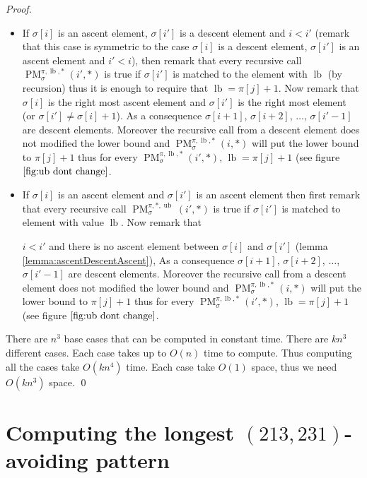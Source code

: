 \documentclass[a4paper]{llncs}
\newcommand{\ptext}{\pi}
\newcommand{\ppattern}{\sigma}
\DeclareMathOperator{\PMa}{PM}
\newcommand{\PM}[6]{\PMa_{{#1}}^{{#2},{#3},{#4}}({#5},{#6})}
\DeclareMathOperator{\lb}{lb}
\DeclareMathOperator{\ub}{ub}
\begin{document}
\begin{proof}
\begin{itemize}
\begin{itemize}
			\item If $\ppattern[i]$ is an ascent element, $\ppattern[i']$ is a descent element and $i<i'$ (remark that this case is symmetric to the case $\ppattern[i]$ is a descent element, $\ppattern[i']$ is an ascent element and $i'<i$), then
			remark that every recursive call
			$\PM{\sigma}{\ptext}{\lb}{*}{i'}{*}$ is true if $\sigma[i']$ is matched to the element with $\lb$ (by recursion) thus it is enough to require that $\lb=\ptext[j]+1$.
			Now remark that
			$\ppattern[i]$ is the right most ascent element and $\ppattern[i']$ is the right most element (or $\ppattern[i'] \neq \ppattern[i]+1$). 
			As a consequence $\sigma[i+1]$, $\sigma[i+2]$, $\ldots$, $\sigma[i'-1]$ are descent elements. Moreover the recursive call from a descent element does not modified the lower bound and $\PM{\sigma}{\ptext}{\lb}{*}{i}{*}$ will put the lower bound to $\ptext[j]+1$
			thus for every $\PM{\sigma}{\ptext}{\lb}{*}{i'}{*}$, $\lb=\ptext[j]+1$ (see figure $\ref{fig:ub dont change}$. 	
			
			\item If $\ppattern[i]$ is an ascent element and $\ppattern[i']$ is an ascent element then
			first remark that every recursive call
			$\PM{\sigma}{\ptext}{*}{\ub}{i'}{*}$ is true if $\sigma[i']$ is matched to element with value $\lb$. 
			Now remark that

			$i<i'$ and there is no  ascent element between $\ppattern[i]$ and $\ppattern[i']$ (lemma \ref{lemma:ascentDescentAscent}), 
			As a consequence $\sigma[i+1]$, $\sigma[i+2]$, $\ldots$, $\sigma[i'-1]$ are descent elements.  Moreover the recursive call from a descent element does not modified the lower bound and $\PM{\sigma}{\ptext}{\lb}{*}{i}{*}$ will put the lower bound to $\ptext[j]+1$ thus for every $\PM{\sigma}{\ptext}{\lb}{*}{i'}{*}$, $\lb=\ptext[j]+1$ (see figure $\ref{fig:ub dont change}$.
		\end{itemize}
\end{itemize}

There are $n^3$ base cases that can be computed in constant time.
There are $kn^3$ different cases. Each case takes up to $O(n)$ time to compute.
Thus computing all the cases take $O(kn^4)$ time.
Each case take $O(1)$ space, thus we need $O(kn^3)$ space.
\qed
\end{proof}


\section{Computing the longest $(213,231)$-avoiding pattern}
\label{section:LCS}
\end{document}
